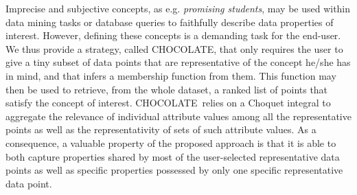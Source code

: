 \newcommand{\nom}{CHOCOLATE}

  Imprecise and subjective concepts, as e.g. {\it promising students}, 
  may be used within data mining tasks or database queries to faithfully describe
  data properties of interest.
  However, defining these concepts is a demanding task for
  the end-user. We thus provide a strategy, called \nom, that
  only requires the user to give a tiny subset of data points that
  are representative of the concept he/she has in mind, and that
  infers a membership function from them. This function may then be
  used to retrieve, from the whole dataset, a ranked list of points that satisfy the concept of interest. \nom\ relies on a
  Choquet integral to aggregate the relevance of individual attribute
  values among all the representative points as well as the
  representativity of sets of such attribute values.  As a
  consequence, a valuable property of the proposed approach is that it
  is able to both capture properties shared by most of the
  user-selected representative data points as well as specific
  properties possessed by only one specific representative data point.

